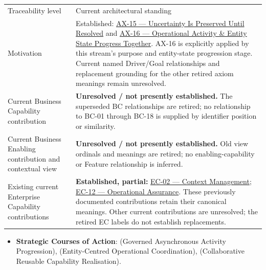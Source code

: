 \begin{longtable}{>{\raggedright\arraybackslash}p{}>{\raggedright\arraybackslash}p{}}
Traceability level & Current architectural standing \\
Motivation & Established: \hyperref[element:ef8abbaec37e4890ad78b9f263e67906]{AX-15 — Uncertainty Is Preserved Until Resolved} and \hyperref[element:de7e90f46127455a9ec9ad3b9b48ba54]{AX-16 — Operational Activity \& Entity State Progress Together}. AX-16 is explicitly applied by this stream’s purpose and entity-state progression stage. Current named Driver/Goal relationships and replacement grounding for the other retired axiom meanings remain unresolved. \\
Current Business Capability contribution & \textbf{Unresolved / not presently established.} The superseded BC relationships are retired; no relationship to BC-01 through BC-18 is supplied by identifier position or similarity. \\
Current Business Enabling contribution and contextual view & \textbf{Unresolved / not presently established.} Old view ordinals and meanings are retired; no enabling-capability or Feature relationship is inferred. \\
Existing current Enterprise Capability contributions & \textbf{Established, partial:} \href{\detokenize{../../../../../../../../../docs/markdown/02-strategy/capabilities/enterprise-capabilities.md#ec-02-context-management}}{EC-02 — Context Management}; \href{\detokenize{../../../../../../../../../docs/markdown/02-strategy/capabilities/enterprise-capabilities.md#ec-12-operational-assurance}}{EC-12 — Operational Assurance}. These previously documented contributions retain their canonical meanings. Other current contributions are unresolved; the retired EC labels do not establish replacements. \\
\end{longtable}


\begin{itemize}


\item \textbf{Strategic Courses of Action}: \texttt{} (Governed Asynchronous Activity Progression), \texttt{} (Entity-Centred Operational Coordination), \texttt{} (Collaborative Reusable Capability Realisation).

\end{itemize}

